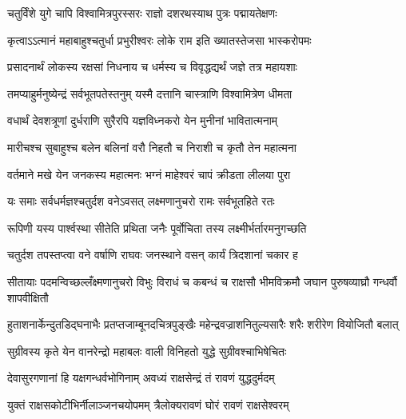
\notes{}
\textlink{}
\translink{}

\storymeta



\addtocounter{shlokacount}{120}

\twolineshloka
{चतुर्विंशे युगे चापि विश्वामित्रपुरस्सरः}
{राज्ञो दशरथस्याथ पुत्रः पद्मायतेक्षणः}%

\twolineshloka
{कृत्वाऽऽत्मानं महाबाहुश्चतुर्धा प्रभुरीश्वरः}
{लोके राम इति ख्यातस्तेजसा भास्करोपमः}%

\twolineshloka
{प्रसादनार्थं लोकस्य रक्षसां निधनाय च}
{धर्मस्य च विवृद्धद्यर्थं जज्ञे तत्र महायशाः}%

\twolineshloka
{तमप्याहुर्मनुष्येन्द्रं सर्वभूतपतेस्तनुम्}
{यस्मै दत्तानि चास्त्राणि विश्वामित्रेण धीमता}%

\twolineshloka
{वधार्थं देवशत्रूणां दुर्धराणि सुरैरपि}
{यज्ञविध्नकरो येन मुनीनां भावितात्मनाम्}%

\twolineshloka
{मारीचश्च सुबाहुश्च बलेन बलिनां वरौ}
{निहतौ च निराशी च कृतौ तेन महात्मना}%

\twolineshloka
{वर्तमाने मखे येन जनकस्य महात्मनः} 
{भग्नं माहेश्वरं चापं क्रीडता लीलया पुरा} %

\twolineshloka
{यः समाः सर्वधर्मज्ञश्चतुर्दश वनेऽवसत्}
{लक्ष्मणानुचरो रामः सर्वभूतहिते रतः}%

\twolineshloka
{रूपिणी यस्य पार्श्वस्था सीतेति प्रथिता जनैः}
{पूर्वोचिता तस्य लक्ष्मीर्भर्तारमनुगच्छति}%

\twolineshloka
{चतुर्दश तपस्तप्त्वा वने वर्षाणि राघवः}
{जनस्थाने वसन् कार्यं त्रिदशानां चकार ह}%


\threelineshloka
{सीतायाः पदमन्विच्छल्लँक्ष्मणानुचरो विभुः}
{विराधं च कबन्धं च राक्षसौ भीमविक्रमौ}
{जघान पुरुषव्याघ्रौ गन्धर्वौ शापवीक्षितौ}%

\twolineshloka
{हुताशनार्केन्दुतडिद्घनाभैः प्रतप्तजाम्बूनदचित्रपुङ्खैः}
{महेन्द्रवज्राशनितुल्यसारैः शरैः शरीरेण वियोजितौ बलात्}%

\twolineshloka
{सुग्रीवस्य कृते येन वानरेन्द्रो महाबलः}
{वाली विनिहतो युद्धे सुग्रीवश्चाभिषेचितः}%

\twolineshloka
{देवासुरगणानां हि यक्षगन्धर्वभोगिनाम्}
{अवध्यं राक्षसेन्द्रं तं रावणं युद्धदुर्मदम्}%

\twolineshloka
{युक्तं राक्षसकोटीभिर्नीलाञ्जनचयोपमम्}
{त्रैलोक्यरावणं घोरं रावणं राक्षसेश्वरम्}%

